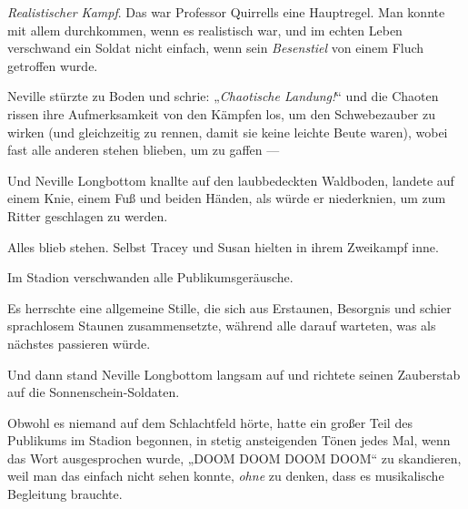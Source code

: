 \emph{Realistischer Kampf}. Das war Professor Quirrells eine Hauptregel. Man konnte mit allem durchkommen, wenn es realistisch war, und im echten Leben verschwand ein Soldat nicht einfach, wenn sein \emph{Besenstiel} von einem Fluch getroffen wurde.

Neville stürzte zu Boden und schrie:
„\emph{Chaotische Landung!}“ und die Chaoten rissen ihre Aufmerksamkeit von den Kämpfen los, um den Schwebezauber zu wirken (und gleichzeitig zu rennen, damit sie keine leichte Beute waren), wobei fast alle anderen stehen blieben, um zu gaffen —

Und Neville Longbottom knallte auf den laubbedeckten Waldboden, landete auf einem Knie, einem Fuß und beiden Händen, als würde er niederknien, um zum Ritter geschlagen zu werden.

Alles blieb stehen. Selbst Tracey und Susan hielten in ihrem Zweikampf inne.

Im Stadion verschwanden alle Publikumsgeräusche.

Es herrschte eine allgemeine Stille, die sich aus Erstaunen, Besorgnis und schier sprachlosem Staunen zusammensetzte, während alle darauf warteten, was als nächstes passieren würde.

Und dann stand Neville Longbottom langsam auf und richtete seinen Zauberstab auf die Sonnenschein-Soldaten.

Obwohl es niemand auf dem Schlachtfeld hörte, hatte ein großer Teil des Publikums im Stadion begonnen, in stetig ansteigenden Tönen jedes Mal, wenn das Wort ausgesprochen wurde,
„DOOM DOOM DOOM DOOM“ zu skandieren, weil man das einfach nicht sehen konnte, \emph{ohne} zu denken, dass es musikalische Begleitung brauchte.

